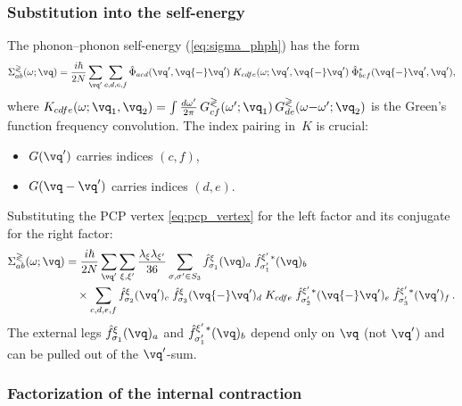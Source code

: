 \subsubsection{Substitution into the self-energy}
\label{sssub:pcp_substitution}

The phonon--phonon self-energy (\cref{eq:sigma_phph}) has the form
\begin{equation}\label{eq:sigma_structure}
  \Sigma^{\gtrless}_{ab}(\omega;\vq)
  = \frac{i\hbar}{2N}\sum_{\vq'}
    \sum_{c,d,e,f}
    \hat\Phi_{acd}(\vq',\vq{-}\vq')\;
    K_{cdfe}(\omega;\vq',\vq{-}\vq')\;
    \hat\Phi^*_{bef}(\vq{-}\vq',\vq'),
\end{equation}
where
$K_{cdfe}(\omega;\vq_1,\vq_2) = \int \frac{d\omega'}{2\pi}\,
G^{\gtrless}_{cf}(\omega';\vq_1)\,G^{\gtrless}_{de}(\omega{-}\omega';\vq_2)$
is the Green's function frequency convolution.  The index pairing
in~$K$ is crucial:
\begin{itemize}
  \item $G(\vq')$ carries indices $(c, f)$,
  \item $G(\vq - \vq')$ carries indices $(d, e)$.
\end{itemize}

Substituting the PCP vertex \cref{eq:pcp_vertex} for the left
factor and its conjugate for the right factor:
\begin{align}\label{eq:pcp_sigma_full}
  \Sigma^{\gtrless}_{ab}(\omega;\vq)
  &= \frac{i\hbar}{2N}\sum_{\vq'}
    \sum_{\xi,\xi'} \frac{\lambda_\xi \lambda_{\xi'}}{36}
    \sum_{\sigma,\sigma'\in S_3}
    \hat{f}_{\sigma_1}^\xi(\vq)_a\;
    \hat{f}_{\sigma'_1}^{\xi'\,*}(\vq)_b
    \notag\\
  &\quad\times
    \sum_{c,d,e,f}
    \hat{f}_{\sigma_2}^\xi(\vq')_c\;
    \hat{f}_{\sigma_3}^\xi(\vq{-}\vq')_d\;
    K_{cdfe}\;
    \hat{f}_{\sigma'_2}^{\xi'\,*}(\vq{-}\vq')_e\;
    \hat{f}_{\sigma'_3}^{\xi'\,*}(\vq')_f\,.
\end{align}
The external legs $\hat{f}_{\sigma_1}^\xi(\vq)_a$ and
$\hat{f}_{\sigma'_1}^{\xi'\,*}(\vq)_b$ depend only on $\vq$ (not
$\vq'$) and can be pulled out of the $\vq'$-sum.


\subsubsection{Factorization of the internal contraction}
\label{sssub:pcp_factorization}

